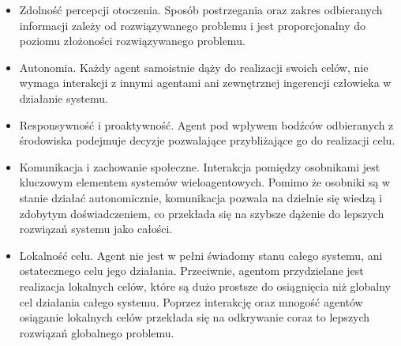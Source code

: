{    \begin{itemize}
        \item Zdolność percepcji otoczenia. Sposób postrzegania oraz zakres odbieranych informacji zależy od
        rozwiązywanego problemu i jest proporcjonalny do poziomu złożoności rozwiązywanego problemu.
        \item Autonomia. Każdy agent samoistnie dąży do realizacji swoich celów, nie wymaga interakcji z innymi agentami
        ani zewnętrznej ingerencji człowieka w działanie systemu.
        \item Responsywność i proaktywność. Agent pod wpływem bodźców odbieranych z środowiska podejmuje decyzje
        pozwalające przybliżające go do realizacji celu.
        \item Komunikacja i zachowanie społeczne. Interakcja pomiędzy osobnikami jest kluczowym elementem systemów
        wieloagentowych. Pomimo że osobniki są w stanie działać autonomicznie, komunikacja pozwala na dzielnie się
        wiedzą i zdobytym doświadczeniem, co przekłada się na szybsze dążenie do lepszych rozwiązań systemu jako
        całości.
        \item Lokalność celu. Agent nie jest w pełni świadomy stanu całego systemu, ani ostatecznego celu jego
        działania. Przeciwnie, agentom przydzielane jest realizacja lokalnych celów, które są dużo prostsze do
        osiągnięcia niż globalny cel działania całego systemu. Poprzez interakcję oraz mnogość agentów osiąganie
        lokalnych celów przekłada się na odkrywanie coraz to lepszych rozwiązań globalnego problemu.
    \end{itemize}

}
